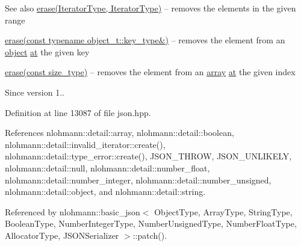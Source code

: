 \begin{DoxySeeAlso}{See also}
\hyperlink{classnlohmann_1_1basic__json_a4b3f7eb2d4625d95a51fbbdceb7c5f39}{erase(\+Iterator\+Type, Iterator\+Type)} -- removes the elements in the given range 

\hyperlink{classnlohmann_1_1basic__json_a2f8484d69c55d8f2a9697a7bec29362a}{erase(const typename object\+\_\+t\+::key\+\_\+type\&)} -- removes the element from an \hyperlink{classnlohmann_1_1basic__json_aa13f7c0615867542ce80337cbcf13ada}{object} \hyperlink{classnlohmann_1_1basic__json_a73ae333487310e3302135189ce8ff5d8}{at} the given key 

\hyperlink{classnlohmann_1_1basic__json_a88cbcefe9a3f4d294bed0653550a5cb9}{erase(const size\+\_\+type)} -- removes the element from an \hyperlink{classnlohmann_1_1basic__json_aa80485befaffcadaa39965494e0b4d2e}{array} \hyperlink{classnlohmann_1_1basic__json_a73ae333487310e3302135189ce8ff5d8}{at} the given index
\end{DoxySeeAlso}
\begin{DoxySince}{Since}
version 1.. 
\end{DoxySince}


Definition at line 13087 of file json.\+hpp.



References nlohmann\+::detail\+::array, nlohmann\+::detail\+::boolean, nlohmann\+::detail\+::invalid\+\_\+iterator\+::create(), nlohmann\+::detail\+::type\+\_\+error\+::create(), J\+S\+O\+N\+\_\+\+T\+H\+R\+OW, J\+S\+O\+N\+\_\+\+U\+N\+L\+I\+K\+E\+LY, nlohmann\+::detail\+::null, nlohmann\+::detail\+::number\+\_\+float, nlohmann\+::detail\+::number\+\_\+integer, nlohmann\+::detail\+::number\+\_\+unsigned, nlohmann\+::detail\+::object, and nlohmann\+::detail\+::string.



Referenced by nlohmann\+::basic\+\_\+json$<$ Object\+Type, Array\+Type, String\+Type, Boolean\+Type, Number\+Integer\+Type, Number\+Unsigned\+Type, Number\+Float\+Type, Allocator\+Type, J\+S\+O\+N\+Serializer $>$\+::patch().


